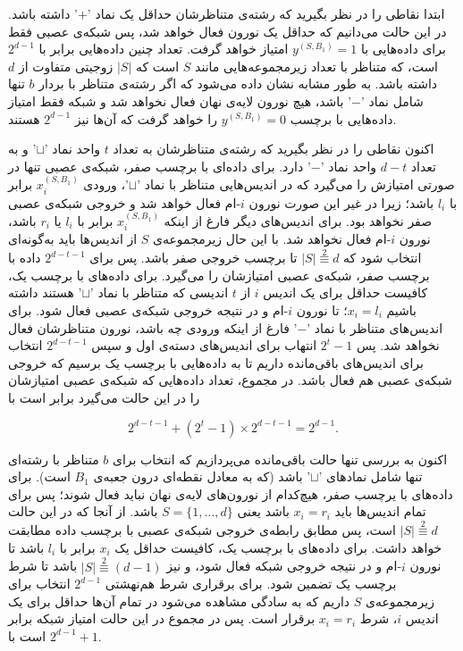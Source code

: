 ابتدا نقاطی را در نظر بگیرید که رشته‌ی متناظرشان حداقل یک نماد '$+$' داشته باشد. در این حالت می‌دانیم که حداقل یک نورون فعال خواهد شد، پس شبکه‌ی عصبی فقط برای داده‌هایی با
$y^{(S, B_1)}=1$
امتیاز خواهد گرفت. تعداد چنین داده‌هایی برابر با $2^{d-1}$ است، که متناظر با تعداد زیرمجموعه‌هایی مانند $S$ است که $|S|$ زوجیتی متفاوت از $d$ داشته باشد. به طور مشابه نشان داده می‌شود که اگر رشته‌ی متناظر با بردار $b$ تنها شامل نماد '$-$' باشد، هیچ نورون لایه‌ی نهان فعال نخواهد شد و شبکه فقط امتیاز داده‌هایی با برچسب
$y^{(S, B_1)}=0$
را خواهد گرفت که آن‌ها نیز $2^{d-1}$ هستند.

اکنون نقاطی را در نظر بگیرید که رشته‌ی متناظرشان به تعداد $t$ واحد نماد '$\sqcup$' و به تعداد $d-t$ واحد نماد '$-$' دارد. برای داده‌ای با برچسب صفر، شبکه‌ی عصبی تنها در صورتی امتیازش را می‌گیرد که در اندیس‌هایی متناظر با نماد '$\sqcup$'، ورودی $x_i^{(S,B_1)}$ برابر با $l_i$ باشد؛ زیرا در غیر این صورت نورون $i$-ام فعال خواهد شد و خروجی شبکه‌ی عصبی صفر نخواهد بود. برای اندیس‌های دیگر فارغ از اینکه $x_i^{(S,B_1)}$ برابر با $l_i$ یا $r_i$ باشد، نورون $i$-ام فعال نخواهد شد. با این حال زیرمجموعه‌ی $S$ از اندیس‌ها باید به‌گونه‌ای انتخاب شود که
$|S| \overset{2}{\equiv} d$
تا برچسب خروجی صفر باشد. پس برای
$2^{d-t-1}$
داده با برچسب صفر، شبکه‌ی عصبی امتیازشان را می‌گیرد. برای داده‌های با برچسب یک، کافیست حداقل برای یک اندیس $i$ از $t$ اندیسی که متناظر با نماد '$\sqcup$' هستند داشته باشیم $x_i=l_i$؛ تا نورون $i$-ام و در نتیجه خروجی شبکه‌ی عصبی فعال شود. برای اندیس‌های متناظر با نماد '$-$' فارغ از اینکه ورودی چه باشد، نورون متناظرشان فعال نخواهد شد. پس $2^t-1$ انتهاب برای اندیس‌های دسته‌ی اول و سپس $2^{d-t-1}$ انتخاب برای اندیس‌های باقی‌مانده داریم تا به داده‌هایی با برچسب یک برسیم که خروجی شبکه‌ی عصبی هم فعال باشد. در مجموع، تعداد داده‌هایی که شبکه‌ی عصبی امتیازشان را در این حالت می‌گیرد برابر است با

$$2^{d-t-1} + (2^t-1) \times 2^{d-t-1} = 2^{d-1}.$$

اکنون به بررسی تنها حالت باقی‌مانده می‌پردازیم که انتخاب برای $b$ متناظر با رشته‌ای تنها شامل نمادهای '$\sqcup$' باشد (که به معادل نقطه‌ای درون جعبه‌ی $B_1$ است). برای داده‌های با یرچسب صفر، هیچ‌کدام از نورون‌های لایه‌ی نهان نباید فعال شوند؛ پس برای تمام اندیس‌ها باید $x_i=r_i$ باشد یعنی
${ S=\{1, \dots, d\} }$ 
باشد. از آنجا که در این حالت
$|S| \overset{2}{\equiv} d$
است، پس مطابق رابطه‌ی
خروجی شبکه‌ی عصبی با برچسب داده مطابقت خواهد داشت. برای داده‌های با برچسب یک، کافیست حداقل یک $x_i$ برابر با $l_i$ باشد تا نورون $i$-ام و در نتیجه خروجی شبکه فعال شود، و نیز
$|S| \overset{2}{\equiv} (d-1)$
باشد تا شرط برچسب یک تضمین شود. برای برقراری شرط هم‌نهشتی $2^{d-1}$ انتخاب برای زیرمجموعه‌ی $S$ داریم که به سادگی مشاهده می‌شود در تمام آن‌ها حداقل برای یک اندیس $i$، شرط $x_i=r_i$ برقرار است. پس در مجموع در این حالت امتیاز شبکه برابر است با
$2^{d-1}+1$.


